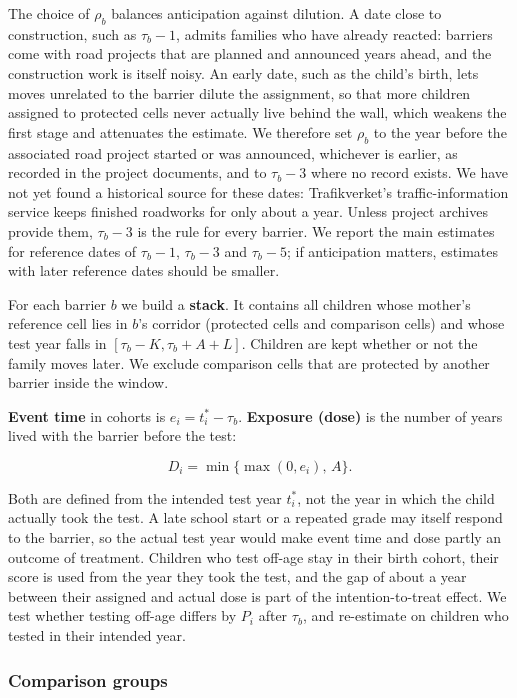\documentclass[11pt]{article}
\begin{document}
The choice of \(\rho_b\) balances anticipation against dilution. A date close to construction, such as \(\tau_b - 1\), admits families who have already reacted: barriers come with road projects that are planned and announced years ahead, and the construction work is itself noisy. An early date, such as the child's birth, lets moves unrelated to the barrier dilute the assignment, so that more children assigned to protected cells never actually live behind the wall, which weakens the first stage and attenuates the estimate. We therefore set \(\rho_b\) to the year before the associated road project started or was announced, whichever is earlier, as recorded in the project documents, and to \(\tau_b - 3\) where no record exists. We have not yet found a historical source for these dates: Trafikverket's traffic-information service keeps finished roadworks for only about a year. Unless project archives provide them, \(\tau_b - 3\) is the rule for every barrier. We report the main estimates for reference dates of \(\tau_b - 1\), \(\tau_b - 3\) and \(\tau_b - 5\); if anticipation matters, estimates with later reference dates should be smaller.

For each barrier \(b\) we build a \textbf{stack}. It contains all children whose mother's reference cell lies in \(b\)'s corridor (protected cells and comparison cells) and whose test year falls in \([\tau_b - K, \tau_b + A + L]\). Children are kept whether or not the family moves later. We exclude comparison cells that are protected by another barrier inside the window.

\textbf{Event time} in cohorts is \(e_i = t^*_i - \tau_b\). \textbf{Exposure (dose)} is the number of years lived with the barrier before the test:

\[
D_i = \min\{\max(0, e_i),\, A\}.
\]

Both are defined from the intended test year \(t^*_i\), not the year in which the child actually took the test. A late school start or a repeated grade may itself respond to the barrier, so the actual test year would make event time and dose partly an outcome of treatment. Children who test off-age stay in their birth cohort, their score is used from the year they took the test, and the gap of about a year between their assigned and actual dose is part of the intention-to-treat effect. We test whether testing off-age differs by \(P_i\) after \(\tau_b\), and re-estimate on children who tested in their intended year.

\subsubsection{Comparison groups}
\end{document}
